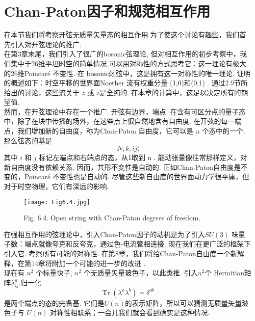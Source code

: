 \section{Chan-Paton因子和规范相互作用}%
在本节我们将考察开弦无质量矢量态的相互作用.为了使这个讨论有趣些，我们首先引入对开弦理论的推广.\\
在第3章末尾，我们引入了很广的bosonic弦理论, 但对相互作用的初步考察中，我们集中于26维平坦时空的简单情况.可以用对称性的方式思考它：这一理论有极大的26维Poincaré 不变性. 在 bosonic闭弦中，这是拥有这一对称性的唯一理论. 证明的概述如下：时空平移的世界面Noether 流有权重分量 (1,0)和(0,1) .  通过2.9节所给出的讨论，这些流关于 $z$ 或 $\bar{z}$是全纯的. 在本章的计算中，这足以决定所有的期望值.\\
然而，在开弦理论中存在一个推广. 开弦有边界，端点. 在含有可区分点的量子态中，除了在块中传播的场外，在这些点上很自然地含有自由度. 在开弦的每一端点，我们增加新的自由度，称为Chan-Paton 自由度，它可以是 $n$ 个态中的一个. 那么弦态的基是
\begin{equation}
	|N ; k ; i j\rangle
\end{equation}
其中 $i$ 和 $j$ 标记左端点和右端点的态，从1取到 n . 能动张量像往常那样定义，对新自由度没有依赖关系. 因而，共形不变性是自动的. 正如Chan-Paton自由度是不变的，Poincaré 不变性也是自动的. 尽管这些新自由度的世界面动力学很平庸，但对于时空物理，它们有深远的影响. 
\begin{figure}
	\begin{center}
		\texttt{[image: Fig6.4.jpg]}\\
		\caption{Fig. 6.4. Open string with Chan-Paton degrees of freedom.}\label{Fig6.4}
	\end{center}
\end{figure}
在强相互作用的弦理论中，引入Chan-Paton因子的动机是为了引入$S U(3)$ 味量子数：端点就像夸克和反夸克，通过色-电流管相连接. 现在我们在更广泛的框架下引入它. 考察所有可能的对称性. 在第8章，我们将给Chan-Paton自由度一个新解释，在第14章将附加一个可能的进一步的改进 .\\
现在有 $n^{2}$ 个标量快子, $n^{2}$ 个无质量矢量玻色子，以此类推. 引入$n^{2}$个 Hermitian矩阵$\lambda_{i j}^{a}$,归一化
\begin{equation}
	\operatorname{Tr}\left(\lambda^{a} \lambda^{b}\right)=\delta^{a b}
\end{equation}
是两个端点的态的完备基. 它们是$U(n)$的表示矩阵，所以可以猜测无质量矢量玻色子与 $U(n)$ 对称性相联系；一会儿我们就会看到确实是这种情况.\\
